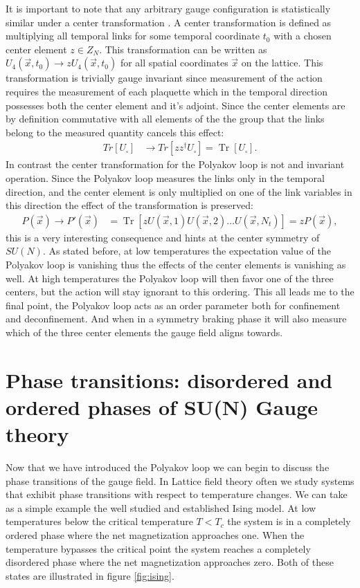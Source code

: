 \documentclass[english,twoside,openright]{UH_TCM_MSc}
\DeclareMathOperator{\Tr}{Tr}
\begin{document}
It is important to note that any arbitrary gauge configuration is statistically similar under a center transformation \cite[ch. 12.1.1]{gattringer2009quantum}. A center transformation is defined as multiplying all temporal links for some temporal coordinate $t_0$ with a chosen center element $z \in Z_N$. This transformation can be written as $U_4(\Vec{x},t_0) \rightarrow zU_4(\Vec{x},t_0)$ for all spatial coordinates $\Vec{x}$ on the lattice. This transformation is trivially gauge invariant since measurement of the action requires the measurement of each plaquette which in the temporal direction possesses both the center element and it's adjoint. Since the center elements are by definition commutative with all elements of the the group that the links belong to the measured quantity cancels this effect:
\begin{align}
    Tr[U_{\square}] &\rightarrow Tr[z z^\dagger U_{\square}] = \Tr[U_\square].
\end{align}
In contrast the center transformation for the Polyakov loop is not and invariant operation. Since the Polyakov loop measures the links only in the temporal direction, and the center element is only multiplied on one of the link variables in this direction the effect of the transformation is preserved:
\begin{align}
    P(\Vec{x}) \rightarrow P'(\Vec{x}) &= \Tr[z U(\Vec{x},1) U(\Vec{x},2) \hdots U(\Vec{x},N_t)] = z P(\Vec{x}),
\end{align}
this is a very interesting consequence and hints at the center symmetry of $SU(N)$. As stated before, at low temperatures the expectation value of the Polyakov loop is vanishing thus the effects of the center elements is vanishing as well. At high temperatures the Polyakov loop will then favor one of the three centers, but the action will stay ignorant to this ordering. This all leads me to the final point, the Polyakov loop acts as an order parameter both for confinement and deconfinement. And when in a symmetry braking phase it will also measure which of the three center elements the gauge field aligns towards. 

\section{Phase transitions: disordered and ordered phases of SU(N) Gauge theory} \label{sec:phase_transition}

Now that we have introduced the Polyakov loop we can begin to discuss the phase transitions of the gauge field. In Lattice field theory often we study systems that exhibit  phase transitions with respect to temperature changes. We can take as a simple example the well studied and established Ising model. At low temperatures below the critical temperature $T < T_c$ the system is in a completely ordered phase where the net magnetization approaches one. When the temperature bypasses the critical point the system reaches a completely disordered phase where the net magnetization approaches zero. Both of these states are illustrated in figure \ref{fig:ising}. 
\end{document}

